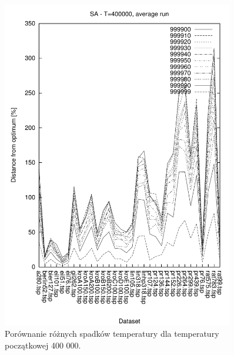 \begin{figure}
\begin{center}
\includegraphics[width=0.9\textwidth]{wykresy/sa/sa_400000_av}
\end{center}
\caption{Porównanie różnych spadków temperatury dla temperatury początkowej 400 000.}
\label{sa_400000_av}
\end{figure}


